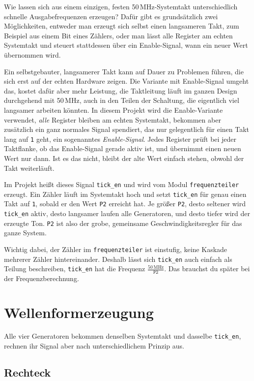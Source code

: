 Wie lassen sich aus einem einzigen, festen 50\,MHz-Systemtakt unterschiedlich schnelle Ausgabefrequenzen erzeugen? Dafür gibt es grundsätzlich zwei Möglichkeiten, entweder man erzeugt sich selbst einen langsameren Takt, zum Beispiel aus einem Bit eines Zählers, oder man lässt alle Register am echten Systemtakt und steuert stattdessen über ein Enable-Signal, wann ein neuer Wert übernommen wird.

Ein selbstgebauter, langsamerer Takt kann auf Dauer zu Problemen führen, die sich erst auf der echten Hardware zeigen. Die Variante mit Enable-Signal umgeht das, kostet dafür aber mehr Leistung, die Taktleitung läuft im ganzen Design durchgehend mit 50\,MHz, auch in den Teilen der Schaltung, die eigentlich viel langsamer arbeiten könnten. In diesem Projekt wird die Enable-Variante verwendet, \emph{alle} Register bleiben am echten Systemtakt, bekommen aber zusätzlich ein ganz normales Signal spendiert, das nur gelegentlich für einen Takt lang auf \texttt{1} geht, ein sogenanntes \emph{Enable-Signal}. Jedes Register prüft bei jeder Taktflanke, ob das Enable-Signal gerade aktiv ist, und übernimmt einen neuen Wert nur dann. Ist es das nicht, bleibt der alte Wert einfach stehen, obwohl der Takt weiterläuft.

Im Projekt heißt dieses Signal \texttt{tick\_en} und wird vom Modul \texttt{frequenzteiler} erzeugt. Ein Zähler läuft im Systemtakt hoch und setzt \texttt{tick\_en} für genau einen Takt auf \texttt{1}, sobald er den Wert \texttt{P2} erreicht hat. Je größer \texttt{P2}, desto seltener wird \texttt{tick\_en} aktiv, desto langsamer laufen alle Generatoren, und desto tiefer wird der erzeugte Ton. \texttt{P2} ist also der grobe, gemeinsame Geschwindigkeitsregler für das ganze System.

Wichtig dabei, der Zähler im \texttt{frequenzteiler} ist einstufig, keine Kaskade mehrerer Zähler hintereinander. Deshalb lässt sich \texttt{tick\_en} auch einfach als Teilung beschreiben, \texttt{tick\_en} hat die Frequenz $\frac{50\,\text{MHz}}{\texttt{P2}}$. Das brauchst du später bei der Frequenzberechnung.

\section{Wellenformerzeugung}

Alle vier Generatoren bekommen denselben Systemtakt und dasselbe \texttt{tick\_en}, rechnen ihr Signal aber nach unterschiedlichem Prinzip aus.

\subsection{Rechteck}

